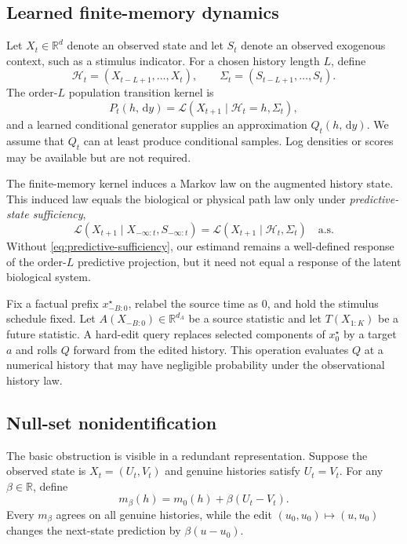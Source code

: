 \documentclass{article}
\newcommand{\R}{\mathbb R}
\newcommand{\Law}{\mathcal L}
\newcommand{\Hist}{\mathcal H}
\newcommand{\dd}{\,\mathrm d}
\theoremstyle{remark}
\begin{document}
\subsection{Learned finite-memory dynamics}

Let \(X_t\in\R^d\) denote an observed state and let \(S_t\) denote an observed
exogenous context, such as a stimulus indicator. For a chosen history length
\(L\), define
\[
  \Hist_t=(X_{t-L+1},\ldots,X_t),\qquad
  \Sigma_t=(S_{t-L+1},\ldots,S_t).
\]
The order-\(L\) population transition kernel is
\begin{equation}
  P_t(h,\dd y)
  =\Law(X_{t+1}\mid \Hist_t=h,\Sigma_t),
  \label{eq:population-kernel}
\end{equation}
and a learned conditional generator supplies an approximation
\(Q_t(h,\dd y)\). We assume that \(Q_t\) can at least produce conditional
samples. Log densities or scores may be available but are not required.

The finite-memory kernel induces a Markov law on the augmented history state.
This induced law equals the biological or physical path law only under
\emph{predictive-state sufficiency},
\begin{equation}
  \Law(X_{t+1}\mid X_{-\infty:t},S_{-\infty:t})
  =
  \Law(X_{t+1}\mid \Hist_t,\Sigma_t)
  \quad\text{a.s.}
  \label{eq:predictive-sufficiency}
\end{equation}
Without \cref{eq:predictive-sufficiency}, our estimand remains a well-defined
response of the order-\(L\) predictive projection, but it need not equal a
response of the latent biological system.

Fix a factual prefix \(x^\star_{-B:0}\), relabel the source time as \(0\), and
hold the stimulus schedule fixed. Let
\(A(X_{-B:0})\in\R^{d_A}\) be a source statistic and let
\(T(X_{1:K})\) be a future statistic. A hard-edit query replaces selected
components of \(x^\star_0\) by a target \(a\) and rolls \(Q\) forward from the
edited history. This operation evaluates \(Q\) at a numerical history that may
have negligible probability under the observational history law.

\subsection{Null-set nonidentification}

The basic obstruction is visible in a redundant representation. Suppose the
observed state is \(X_t=(U_t,V_t)\) and genuine histories satisfy \(U_t=V_t\).
For any \(\beta\in\R\), define
\begin{equation}
  m_\beta(h)=m_0(h)+\beta(U_t-V_t).
  \label{eq:beta-extension}
\end{equation}
Every \(m_\beta\) agrees on all genuine histories, while the edit
\((u_0,u_0)\mapsto(u,u_0)\) changes the next-state prediction by
\(\beta(u-u_0)\).
\end{document}
